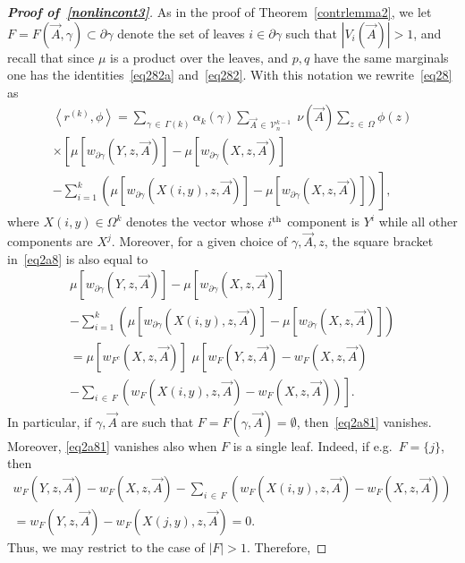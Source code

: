 \documentclass[10pt,a4paper]{article}
\newcommand{\cV}{\mathcal{V}}
\let\g=\gamma
\let\O=\Omega
\begin{document}
\begin{proof}[{\bf Proof of~\eqref{nonlincont3}}]
As in the proof of Theorem~\ref{contrlemma2}, we let $F=F(\vec A,\g)\subset \partial \g$ denote the set of leaves $i\in \partial \g$ such that $|V_i(\vec A)|> 1$, and recall that since $\mu$ is a product over the leaves, and $p,q$ have the same marginals one has the identities~\eqref{eq282a} and~\eqref{eq282}. With this notation we rewrite~\eqref{eq28} as
\begin{multline}\label{eq2a8}
 \left\langle r^{(k)},\phi\right\rangle =\sum_{\gamma\,\in\,\Gamma(k)}\alpha_k(\gamma)
\sum_{\vec A\,\in\,\cV_n^{k-1}}\;\nu(\vec A)\sum_{z\,\in\,\Omega} \phi(z)\\
 \times \left[
\mu\left[w_{\partial \g}\left(Y,z,\vec A\right)\right] - \mu\left[w_{\partial \g}\left(X,z,\vec A\right)\right]\right.\\
-\left. \sum_{i=1}^k\left(\mu\left[w_{\partial \g}\left(X(i,y),z,\vec A\right)\right] - \mu\left[w_{\partial \g}\left(X,z,\vec A\right)\right]
\right)\right],
\end{multline}
where $X(i,y)\in\O^k$ denotes the vector whose $i^{\rm th}$ component is $Y^i$ while all other components are $X^j$. Moreover, for a given choice of $\g,\vec A, z$, the square bracket in~\eqref{eq2a8} is also equal to
\begin{multline}\label{eq2a81}
\mu\left[w_{\partial \g}\left(Y,z,\vec A\right)\right] - \mu\left[w_{\partial \g}\left(X,z,\vec A\right)\right] \\
- \sum_{i=1}^k\left(\mu\left[w_{\partial \g}\left(X(i,y),z,\vec A\right)\right] - \mu\left[w_{\partial \g}\left(X,z,\vec A\right)\right]
\right) \\
 = \mu\left[w_{F^c} \left(X,z,\vec A\right)\right]\,\,\mu\left[w_F \left(Y,z,\vec A\right)-w_F \left(X,z,\vec A\right)\right.\\
\left. -\sum_{i\,\in\,F}
\left(w_{F}\left(X(i,y),z,\vec A\right) - w_{F}\left(X,z,\vec A\right)
\right)\right].
\end{multline}
In particular, if $\g,\vec A$ are such that $F=F(\g,\vec A)=\emptyset$, then~\eqref{eq2a81} vanishes. Moreover, \eqref{eq2a81} vanishes also when $F$ is a single leaf. Indeed, if e.g.\ $F=\{j\}$, then
\begin{multline}\label{eq2a83}
w_F \left(Y,z,\vec A\right)-w_F \left(X,z,\vec A\right)-\sum_{i\,\in\,F}
\left(w_{F}\left(X(i,y),z,\vec A\right) - w_{F}\left(X,z,\vec A\right)
\right)\\
=w_F \left(Y,z,\vec A\right)- w_{F}\left(X(j,y),z,\vec A\right) = 0.
\end{multline}
Thus, we may restrict to the case of $|F|>1$. Therefore,

\end{proof}
\end{document}
